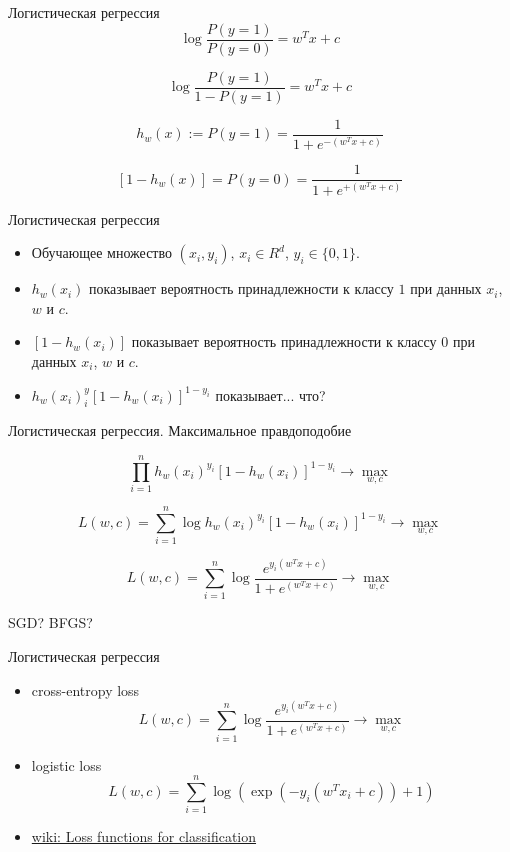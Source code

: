 \documentclass[landscape]{slides}
\begin{document}
\begin{slide}
Логистическая регрессия
$$ \log\frac{P(y=1)}{P(y=0)} = w^T x + c $$

$$ \log\frac{P(y=1)}{1-P(y=1)} = w^T x + c $$

$$ h_w(x) := P(y=1) = \frac 1{1+e^{-(w^T x +c)}} $$

$$ [1-h_w(x)] = P(y=0) = \frac 1{1+e^{+(w^T x +c)}} $$

\end{slide}


\begin{slide}
Логистическая регрессия

\begin{itemize}
\item Обучающее множество $(x_i, y_i)$, $x_i\in R^d$, $y_i\in\{0,1\}$.
\item $h_w(x_i)$ показывает вероятность принадлежности к классу $1$ при данных $x_i$, $w$ и $c$.
\item $ [1-h_w(x_i)]$ показывает вероятность принадлежности к классу $0$ при данных $x_i$, $w$ и $c$.
\item $ h_w(x_i)^y_i [1-h_w(x_i)]^{1-y_i}$ показывает... что?
\end{itemize}

\end{slide}


\begin{slide}
Логистическая регрессия. Максимальное правдоподобие

$$ \prod_{i=1}^n h_w(x_i)^{y_i} [1-h_w(x_i)]^{1-y_i} \to \max_{w,c}$$

$$ L(w,c)=\sum_{i=1}^n \log h_w(x_i)^{y_i} [1-h_w(x_i)]^{1-y_i} \to \max_{w,c}$$

$$ L(w,c)=\sum_{i=1}^n \log \frac{e^{y_i(w^T x +c)}}{1+e^{(w^T x + c)}} \to \max_{w,c}$$

SGD? BFGS? 

\end{slide}


\begin{slide}
Логистическая регрессия
\begin{itemize}
\item cross-entropy loss
$$ L(w,c)=\sum_{i=1}^n \log \frac{e^{y_i(w^T x +c)}}{1+e^{(w^T x + c)}} \to \max_{w,c}$$
\item logistic loss
$$ L(w,c) = \sum_{i=1}^n \log(\exp(-y_i(w^T x_i+c))+1) $$
\item \href{https://en.wikipedia.org/wiki/Loss\_functions\_for\_classification}{wiki: Loss functions for classification}
\end{itemize}
\end{slide}
\end{document}
